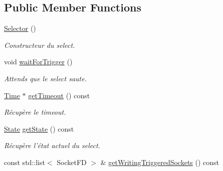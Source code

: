 \subsection*{Public Member Functions}
\begin{DoxyCompactItemize}
\item 
\hypertarget{classmognetwork_1_1_selector_ac2dc59256b3b676a6c04102f5ea5515a}{\hyperlink{classmognetwork_1_1_selector_ac2dc59256b3b676a6c04102f5ea5515a}{Selector} ()}\label{classmognetwork_1_1_selector_ac2dc59256b3b676a6c04102f5ea5515a}

\begin{DoxyCompactList}\small\item\em Constructeur du select. \end{DoxyCompactList}\item 
\hypertarget{classmognetwork_1_1_selector_aba14d0165c8b6408e75a8a7db3cbffb7}{void \hyperlink{classmognetwork_1_1_selector_aba14d0165c8b6408e75a8a7db3cbffb7}{wait\-For\-Trigger} ()}\label{classmognetwork_1_1_selector_aba14d0165c8b6408e75a8a7db3cbffb7}

\begin{DoxyCompactList}\small\item\em Attends que le select saute. \end{DoxyCompactList}\item 
\hyperlink{_selector_8hh_af47ac292ef7224cf549b944d138ba4ae}{Time} $\ast$ \hyperlink{classmognetwork_1_1_selector_ae1cb38fe53e4313751062277b39fbfd5}{get\-Timeout} () const 
\begin{DoxyCompactList}\small\item\em Récupère le timeout. \end{DoxyCompactList}\item 
\hyperlink{classmognetwork_1_1_selector_a51d709c3579bf32265d68d4313df5794}{State} \hyperlink{classmognetwork_1_1_selector_aab8261de074ef927dfe62bb9ddaafb93}{get\-State} () const 
\begin{DoxyCompactList}\small\item\em Récupère l'état actuel du select. \end{DoxyCompactList}\item 
\hypertarget{classmognetwork_1_1_selector_ab35641925422b2082de069f745e0034e}{const std\-::list$<$ Socket\-F\-D $>$ \& \hyperlink{classmognetwork_1_1_selector_ab35641925422b2082de069f745e0034e}{get\-Writing\-Triggered\-Sockets} () const }\label{classmognetwork_1_1_selector_ab35641925422b2082de069f745e0034e}


\end{DoxyCompactItemize}
